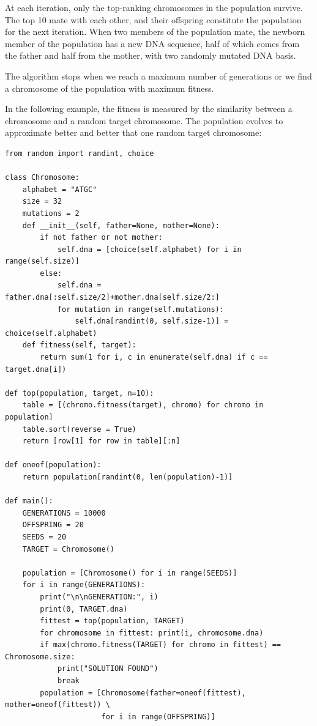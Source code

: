 \documentclass[justified, sixbynine]{tufte-book}
\theoremstyle{plain}%
\newtheorem * {corollary}{Corollary}
\theoremstyle{definition}
\theoremstyle{remark}
\newtheorem * {remark}{Remark}
\newtheorem * {note}{Note}
\begin{document}
\begin{fullwidth}
At each iteration, only the top-ranking chromosomes in the population survive. The top 10 mate with each other, and their offspring constitute the population for the next iteration. When two members of the population mate, the newborn member of the population has a new DNA sequence, half of which comes from the father and half from the mother, with two randomly mutated DNA basis.

The algorithm stops when we reach a maximum number of generations or we find a chromosome of the population with maximum fitness.

In the following example, the fitness is measured by the similarity between a chromosome and a random target chromosome. The population evolves to approximate better and better that one random target chromosome:


\begin{lstlisting}
from random import randint, choice

class Chromosome:
    alphabet = "ATGC"
    size = 32
    mutations = 2
    def __init__(self, father=None, mother=None):
        if not father or not mother:
            self.dna = [choice(self.alphabet) for i in range(self.size)]
        else:
            self.dna = father.dna[:self.size/2]+mother.dna[self.size/2:]
            for mutation in range(self.mutations):
                self.dna[randint(0, self.size-1)] = choice(self.alphabet)
    def fitness(self, target):
        return sum(1 for i, c in enumerate(self.dna) if c == target.dna[i])

def top(population, target, n=10):
    table = [(chromo.fitness(target), chromo) for chromo in population]
    table.sort(reverse = True)
    return [row[1] for row in table][:n]

def oneof(population):
    return population[randint(0, len(population)-1)]

def main():
    GENERATIONS = 10000
    OFFSPRING = 20
    SEEDS = 20
    TARGET = Chromosome()

    population = [Chromosome() for i in range(SEEDS)]
    for i in range(GENERATIONS):
        print("\n\nGENERATION:", i)
        print(0, TARGET.dna)
        fittest = top(population, TARGET)
        for chromosome in fittest: print(i, chromosome.dna)
        if max(chromo.fitness(TARGET) for chromo in fittest) == Chromosome.size:
            print("SOLUTION FOUND")
            break
        population = [Chromosome(father=oneof(fittest), mother=oneof(fittest)) \
                      for i in range(OFFSPRING)]


\end{lstlisting}
\end{fullwidth}
\end{document}

